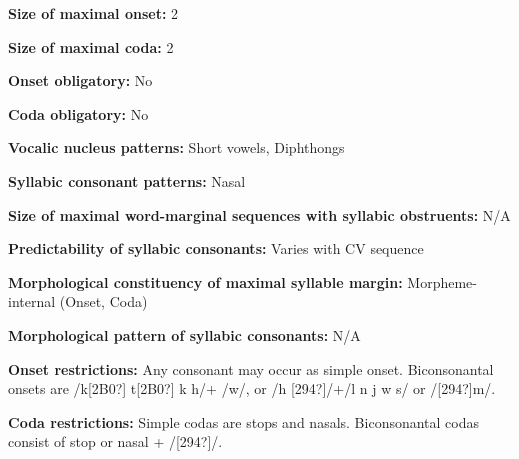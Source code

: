 \begin{styleBody}
\textbf{Size of maximal onset:} 2
\end{styleBody}

\begin{styleBody}
\textbf{Size of maximal coda:} 2
\end{styleBody}

\begin{styleBody}
\textbf{Onset obligatory:} No
\end{styleBody}

\begin{styleBody}
\textbf{Coda obligatory:} No
\end{styleBody}

\begin{styleBody}
\textbf{Vocalic nucleus patterns:} Short vowels, Diphthongs
\end{styleBody}

\begin{styleBody}
\textbf{Syllabic consonant patterns:} Nasal
\end{styleBody}

\begin{styleBody}
\textbf{Size of maximal word{}-marginal sequences with syllabic obstruents:} N/A
\end{styleBody}

\begin{styleBody}
\textbf{Predictability of syllabic consonants:} Varies with CV sequence
\end{styleBody}

\begin{styleBody}
\textbf{Morphological constituency of maximal syllable margin:} Morpheme-internal (Onset, Coda)
\end{styleBody}

\begin{styleBody}
\textbf{Morphological pattern of syllabic consonants:} N/A
\end{styleBody}

\begin{styleBody}
\textbf{Onset restrictions:} Any consonant may occur as simple onset. Biconsonantal onsets are /k[2B0?] t[2B0?] k h/+ /w/, or /h [294?]/+/l n j w s/ or /[294?]m/.
\end{styleBody}

\begin{styleBody}
\textbf{Coda restrictions:} Simple codas are stops and nasals. Biconsonantal codas consist of stop or nasal + /[294?]/.
\end{styleBody}

